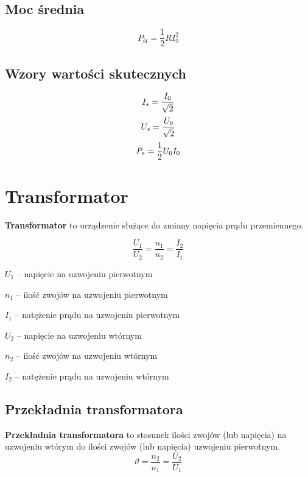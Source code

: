\subsection{Moc średnia}
\begin{equation}
  P_\text{śr} = \frac 1 2 R I_0^2
\end{equation}

\subsection{Wzory wartości skutecznych}
\begin{subequations}
  \setlength\jot{5pt}
  \begin{gather}
    I_s = \frac{I_0}{\sqrt 2}\\
    U_s = \frac{U_0}{\sqrt 2}\\
    P_s = \frac 1 2 U_0 I_0\\
  \end{gather}
\end{subequations}

\section{Transformator}
\begin{definition}
  \textbf{Transformator} to urządzenie służące do zmiany napięcia prądu przemiennego.

  \begin{equation}
    \frac{U_1}{U_2} = \frac{n_1}{n_2} = \frac{I_2}{I_1}
  \end{equation}
  \begin{symbols}
    \item $U_1$ -- napięcie na uzwojeniu pierwotnym
    \item $n_1$ -- ilość zwojów na uzwojeniu pierwotnym
    \item $I_1$ -- natężenie prądu na uzwojeniu pierwotnym
      \vspace{10pt}
    \item $U_2$ -- napięcie na uzwojeniu wtórnym
    \item $n_2$ -- ilość zwojów na uzwojeniu wtórnym
    \item $I_2$ -- natężenie prądu na uzwojeniu wtórnym
  \end{symbols}
\end{definition}

\subsection{Przekładnia transformatora}
\begin{definition}
  \textbf{Przekładnia transformatora} to stosunek ilości zwojów (lub napięcia) na uzwojeniu wtórym
  do ilości zwojów (lub napięcia) uzwojeniu pierwotnym.
  \begin{equation}
    \vartheta = \frac{n_2}{n_1} = \frac{U_2}{U_1}
  \end{equation}
\end{definition}

